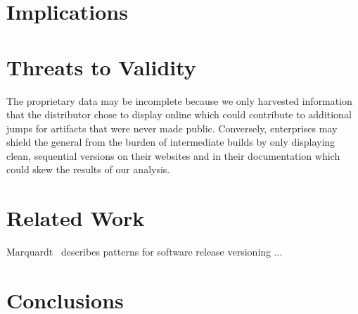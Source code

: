 \documentclass[conference]{IEEEtran}
\begin{document}
\begin{table*}[h]
\begin{adjustbox}{width=\textwidth}
\end{adjustbox}
\end{table*}







\section{Implications}

\section{Threats to Validity}

 The proprietary data may be incomplete because we only harvested information that the distributor chose to display online which could contribute to additional jumps for artifacts that were never made public. Conversely, enterprises may shield the general from the burden of intermediate builds by only displaying clean, sequential versions on their websites and in their documentation which could skew the results of our analysis. 



\section{Related Work}

Marquardt~\cite{Marquardt2010:EuroPLoP} describes patterns for software release versioning ...


\section{Conclusions}

\end{document}
